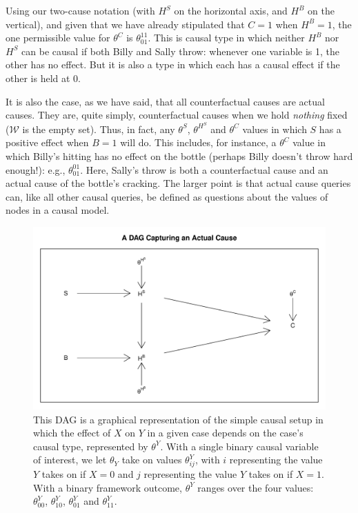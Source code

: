 \documentclass[
  12pt,
]{book}
\begin{document}
Using our two-cause notation (with \(H^S\) on the horizontal axis, and \(H^B\) on the vertical), and given that we have already stipulated that \(C=1\) when \(H^B=1\), the one permissible value for \(\theta^C\) is \(\theta^{11}_{01}\). This is causal type in which neither \(H^B\) nor \(H^S\) can be causal if both Billy and Sally throw: whenever one variable is 1, the other has no effect. But it is also a type in which each has a causal effect if the other is held at 0.

It is also the case, as we have said, that all counterfactual causes are actual causes. They are, quite simply, counterfactual causes when we hold \emph{nothing} fixed (\(\mathcal W\) is the empty set). Thus, in fact, any \(\theta^S\), \(\theta^{H^S}\) and \(\theta^C\) values in which \(S\) has a positive effect when \(B=1\) will do. This includes, for instance, a \(\theta^C\) value in which Billy's hitting has no effect on the bottle (perhaps Billy doesn't throw hard enough!): e.g., \(\theta^{01}_{01}\). Here, Sally's throw is both a counterfactual cause and an actual cause of the bottle's cracking. The larger point is that actual cause queries can, like all other causal queries, be defined as questions about the values of nodes in a causal model.

\begin{figure}

{\centering \includegraphics[width=.5\textwidth]{ii_files/figure-latex/actualquery-1} 

}

\caption{\label{fig:actualquery} This DAG is a graphical representation of the simple causal setup in which the effect of $X$ on $Y$ in a given case depends on the case's causal type, represented by $\theta^Y$. With a single binary causal variable of interest, we let $\theta_Y$ take on values $\theta^Y_{ij}$, with $i$ representing the value $Y$ takes on if $X=0$ and $j$ representing the value $Y$ takes on if $X=1$. With a binary framework outcome, $\theta^Y$ ranges over the four values: $\theta^Y_{00}$, $\theta^Y_{10}$, $\theta^Y_{01}$ and $\theta^Y_{11}$.}\label{fig:actualquery}
\end{figure}
\end{document}

